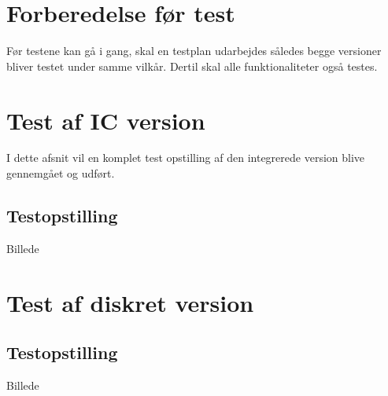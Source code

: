 \section{Forberedelse før test}\label{afs:tests}

Før testene kan gå i gang, skal en testplan udarbejdes således begge versioner bliver testet under samme vilkår. Dertil skal alle funktionaliteter også testes.
\\

\section{Test af IC version}\label{afs:test_ic}
I dette afsnit vil en komplet test opstilling af den integrerede version blive gennemgået og udført.

\subsection{Testopstilling}
Billede

\section{Test af diskret version}\label{afs:test_diskret}


\subsection{Testopstilling}
Billede

